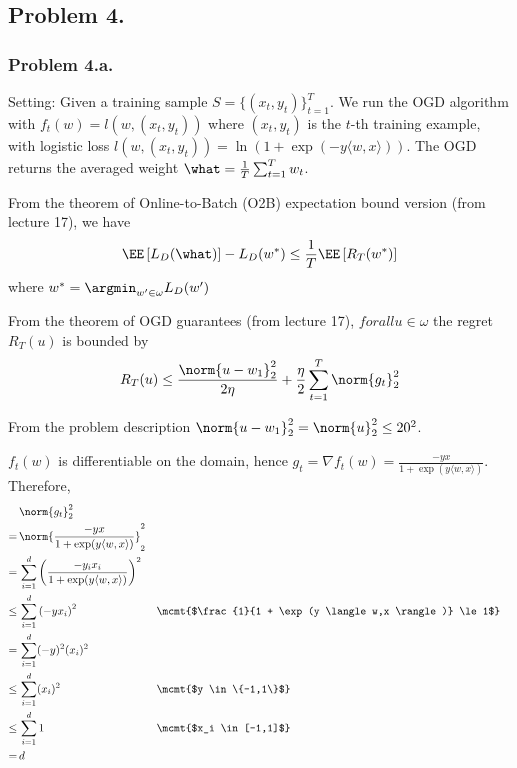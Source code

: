 
\newpage
\subsection*{Problem 4.}

\subsubsection*{Problem 4.a.}

Setting: Given a training sample $S = \{(x_t,y_t)\}_{t=1}^T$. We run the OGD algorithm with $f_t(w) = l(w, (x_t,y_t))$ where $(x_t,y_t)$ is the $t$-th training example, with logistic loss $l(w, (x_t,y_t)) = \ln(1 + \exp(-y\langle w,x \rangle))$. The OGD returns the averaged weight $\what = \frac{1}{T}\sum_{t=1}^T w_t$.

From the theorem of Online-to-Batch (O2B) expectation bound version (from lecture 17), we have
\begin{align*}
  \EE\left[L_D(\what)\right] - L_D(w^*) \le \frac{1}{T} \EE\left[ R_T(w^*) \right]
\end{align*}
where $w^* = \argmin_{w' \in \omega} L_D(w')$

From the theorem of OGD guarantees (from lecture 17), $forall u \in \omega$ the regret $R_T(u)$ is bounded by
\begin{align*}
  R_T(u) \le \frac{\norm{u - w_1}_2^2}{2\eta} + \frac{\eta}{2} \sum_{t=1}^T \norm{g_t}_2^2
\end{align*}

From the problem description $\norm{u - w_1}_2^2 = \norm{u}_2^2 \le 20^2$.

$f_t(w)$ is differentiable on the domain, hence $g_t = \nabla f_t(w) = \frac{-yx}{1 + \exp(y \langle w,x \rangle)}$. Therefore,
\begin{align*}
  &\norm{g_t}_2^2 \\
  =\,&\norm{\frac{-yx}{1 + \exp(y \langle w,x \rangle)}}_2^2 \\
  =\,&\sum_{i=1}^d\left(\frac{-y_ix_i}{1 + \exp(y \langle w,x \rangle)}\right)^2 \\
  \le\,&\sum_{i=1}^d\left(-yx_i\right)^2 && \mcmt{$\frac{1}{1 + \exp(y \langle w,x \rangle)} \le 1$}\\
  =\,&\sum_{i=1}^d(-y)^2(x_i)^2 \\
  \le\,&\sum_{i=1}^d(x_i)^2 && \mcmt{$y \in \{-1,1\}$}\\
  \le\,&\sum_{i=1}^d1 && \mcmt{$x_i \in [-1,1]$}\\
  =\,&d \\
\end{align*}


